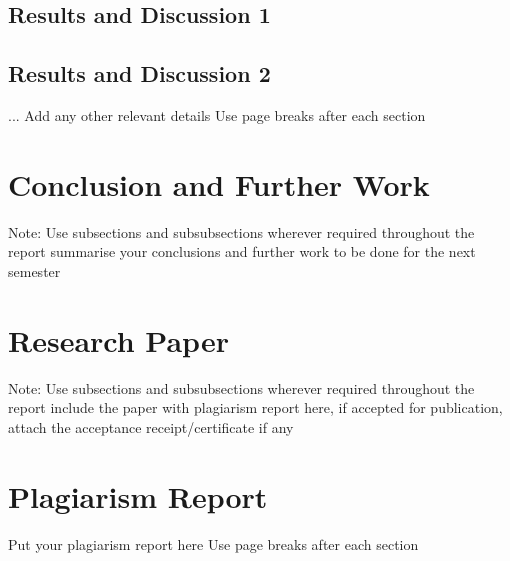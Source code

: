 \documentclass[12pt,singleside,a4paper]{article}
\begin{document}
\subsection{Results and Discussion 1}
\subsection{Results and Discussion 2}
...
\newline Add any other relevant details
\newline Use page breaks after each section

\section{Conclusion and Further Work}
 Note: Use subsections and subsubsections wherever required throughout the report
summarise your conclusions and further work to be done for the next semester
\section{Research Paper}
 Note: Use subsections and subsubsections wherever required throughout the report
include the paper with plagiarism report here, if accepted for publication, attach the acceptance receipt/certificate if any
\section{Plagiarism Report}
Put your plagiarism report here
\newline Use page breaks after each section
\end{document}

